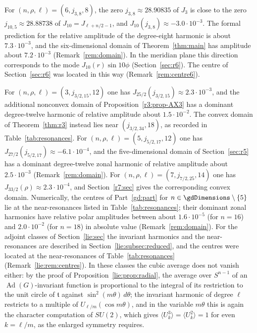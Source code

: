\documentclass[11pt]{amsart}
\theoremstyle{definition}
\theoremstyle{remark}
\numberwithin{equation}{section}
\newcommand{\Ad}{\operatorname{Ad}}
\newcommand{\tf}{\mathfrak{t}}
\begin{document}
For $(n,\rho,\ell)=(6,j_{3,8},8)$, the zero $j_{3,8}\approx28.90835$ of $J_3$ is close to the zero $j_{10,5}\approx28.88738$ of $J_{10}=J_{\ell+n/2-1}$, and $J_{10}(j_{3,8})\approx-3.0\cdot10^{-3}$. The formal prediction for the relative amplitude of the degree-eight harmonic is about $7.3\cdot10^{-3}$, and the six-dimensional domain of Theorem~\ref{thm:main} has amplitude about $7.2\cdot10^{-3}$ (Remark~\ref{rem:domain}). In the meridian plane this direction corresponds to the mode $J_{10}(r)\sin10\phi$ (Section~\ref{sec:r6}). The centre of Section~\ref{sec:r6} was located in this way (Remark~\ref{rem:centre6}).

For $(n,\rho,\ell)=(3,j_{3/2,15},12)$ one has $J_{25/2}(j_{3/2,15})\approx2.3\cdot10^{-3}$, and the additional nonconvex domain of Proposition~\ref{r3:prop-AX3} has a dominant degree-twelve harmonic of relative amplitude about $1.5\cdot10^{-2}$. The convex domain of Theorem~\ref{thm:r3} instead lies near $(j_{3/2,34},18)$, as recorded in Table~\ref{tab:resonances}. For $(n,\rho,\ell)=(5,j_{5/2,17},12)$ one has $J_{27/2}(j_{5/2,17})\approx-6.1\cdot10^{-4}$, and the five-dimensional domain of Section~\ref{sec:r5} has a dominant degree-twelve zonal harmonic of relative amplitude about $2.5\cdot10^{-3}$ (Remark~\ref{rem:domain}). For $(n,\rho,\ell)=(7,j_{7/2,25},14)$ one has $J_{33/2}(\rho)\approx2.3\cdot10^{-4}$, and Section~\ref{r7:sec} gives the corresponding convex domain. Numerically, the centres of Part~\ref{gd:part} for $n\in\gdDimensions\setminus\{5\}$ lie at the near-resonances listed in Table~\ref{tab:resonances}; their dominant zonal harmonics have relative polar amplitudes between about $1.6\cdot10^{-5}$ (for $n=16$) and $2.0\cdot10^{-2}$ (for $n=18$) in absolute value (Remark~\ref{rem:domain}). For the adjoint classes of Section~\ref{lie:sec} the invariant harmonics and the near-resonances are described in Section~\ref{lie:subsec:reduced}, and the centres were located at the near-resonances of Table~\ref{tab:resonances} (Remark~\ref{lie:rem:centres}). In these classes the cubic average does not vanish either: by the proof of Proposition~\ref{lie:prop:radial}, the average over $S^{n-1}$ of an $\Ad(G)$-invariant function is proportional to the integral of its restriction to the unit circle of $\tf$ against $\sin^2(m\theta)\,d\theta$; the invariant harmonic of degree $\ell$ restricts to a multiple of $U_{\ell/m}(\cos m\theta)$, and in the variable $m\theta$ this is again the character computation of $SU(2)$, which gives $\langle U_k^3\rangle=\langle U_k^2\rangle=1$ for even $k=\ell/m$, as the enlarged symmetry requires.
\end{document}
